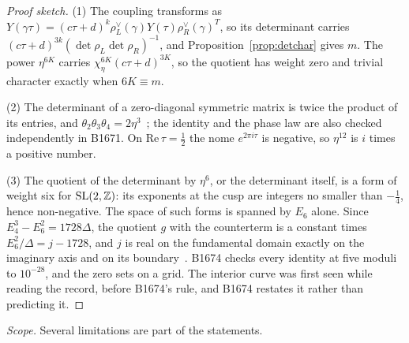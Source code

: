\begin{proof}[Proof sketch]
(1) The coupling transforms as $Y(\gamma\tau)=(c\tau+d)^k\rho_L^\vee(\gamma)Y(\tau)\rho_R^\vee(\gamma)^{T}$, so its
determinant carries $(c\tau+d)^{3k}(\det\rho_L\det\rho_R)^{-1}$, and Proposition~\ref{prop:detchar} gives $m$. The power
$\eta^{6K}$ carries $\chi_\eta^{6K}(c\tau+d)^{3K}$, so the quotient has weight zero and trivial character exactly when
$6K\equiv m$.

(2) The determinant of a zero-diagonal symmetric matrix is twice the product of its entries, and
$\theta_2\theta_3\theta_4=2\eta^3$~\cite{WhittakerWatson1927}; the identity and the phase law are also checked
independently in B1671. On $\mathrm{Re}\,\tau=\tfrac12$ the nome
$e^{2\pi i\tau}$ is negative, so $\eta^{12}$ is $i$ times a positive number.

(3) The quotient of the determinant by $\eta^6$, or the determinant itself, is a form of weight six for $\mathrm{SL}(2,\mathbb{Z})$:
its exponents at the cusp are integers no smaller than $-\tfrac14$, hence non-negative. The space of such forms is
spanned by $E_6$ alone. Since $E_4^3-E_6^2=1728\Delta$, the quotient $g$ with the counterterm is a constant times
$E_6^2/\Delta=j-1728$, and $j$ is real on the fundamental domain exactly on the imaginary axis and on its
boundary~\cite{DiamondShurman2005}. B1674 checks every identity at five moduli to $10^{-28}$, and the zero sets on a
grid. The interior curve was first seen while reading the record, before B1674's rule, and B1674 restates it rather than
predicting it.
\end{proof}
\noindent\emph{Scope.} Several limitations are part of the statements.
